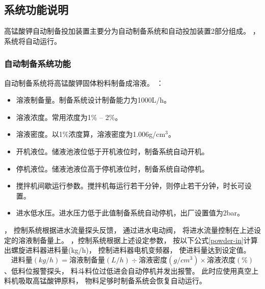 \documentclass[UTF8,a4paper,12pt,titlepage]{ctexart}
\begin{document}
   \subsection{系统功能说明}
      高锰酸钾自动制备投加装置主要分为自动制备系统和自动投加装置2部分组成。
      ，系统将自动运行。
      \subsubsection{自动制备系统功能}
         自动制备系统将高锰酸钾固体粉料制备成溶液。
         ：
         \begin{itemize}
            \item 溶液制备量。制备系统设计制备能力为1000L/h。
            \item 溶液浓度。常用浓度为1\% -- 2\%。
            \item 溶液密度。以1\%浓度算，溶液密度为1.006g/cm$^{3}$。
            \item 开机液位。储液池液位低于开机液位时，制备系统自动开机。
            \item 停机液位。储液池液位高于停机液位时，制备系统自动停机。
            \item 搅拌机间歇运行参数。搅拌机每运行若干分钟，则停止若干分钟，时长可设置。
            \item 进水低水压。进水压力低于此值制备系统自动停机，出厂设置值为2bar。
         \end{itemize}
         ，
         控制系统根据进水流量探头反馈，
         通过进水电动阀，
         将进水流量控制在上述设定的溶液制备量上。
         ，控制系统根据上述设定参数，
         按以下公式\ref{powder-in}计算出螺旋进料器进料量(kg/h)，
         控制进料器电机变频器，
         使进料量达到设定值。
         \begin{equation}
            \label{powder-in}
            \mbox{进料量}(kg/h) = \mbox{溶液制备量}(L/h) \div \mbox{溶液密度}(g/cm^3) \times \mbox{溶液浓度} (\%)
         \end{equation}
         、低料位报警探头，
         料斗料位过低进会自动停机并发出报警。
         此时应使用真空上料机吸取高锰酸钾原料，
         物料足够时制备系统会恢复自动运行。
\end{document}
